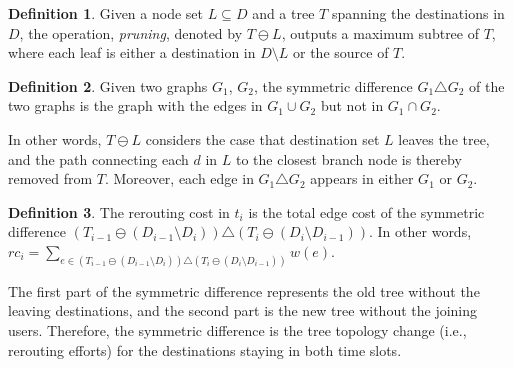 \documentclass[10pt, conference, letterpaper]{IEEEtran}
\theoremstyle{definition}
\newtheorem{defi}{Definition}
\begin{document}
\begin{defi}
Given a node set $L\subseteq D$ and a tree $T$ spanning the destinations in $D$, the operation, \emph{pruning}, denoted by $T\ominus L$, outputs a maximum subtree of $T$, where each leaf is either a destination in $D\setminus L$ or the source of $T$.
\end{defi}

\begin{defi}
Given two graphs $G_1$, $G_2$, the symmetric difference $G_1\triangle G_2$ of the two graphs is the graph with the edges in $G_1\cup G_2$ but not in $G_1\cap G_2$.
\end{defi}

In other words, $T\ominus L$ considers the case that destination set $L$ leaves the tree, and the path connecting each $d$ in $L$ to the closest branch node is thereby removed from $T$. Moreover, each edge in $G_1\triangle G_2$ appears in either $G_1$ or $G_2$.


\begin{defi}
The rerouting cost in $t_i$ is the total edge cost of the symmetric difference $(T_{i-1}\ominus (D_{i-1}\setminus D_{i}) ) \triangle (T_i\ominus (D_{i} \setminus D_{i-1}))$.
In other words, $rc_i=\sum_{e\in (T_{i-1}\ominus (D_{i-1}\setminus D_{i})) \triangle (T_i\ominus(D_{i}\setminus D_{i-1}))}w(e)$.
\end{defi}

The first part of the symmetric difference represents the old tree without the leaving destinations, and the second part is the new tree without the joining users. Therefore, the symmetric difference is the tree topology change (i.e., rerouting efforts) for the destinations staying in both time slots.

\end{document}
